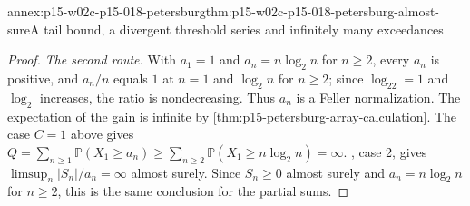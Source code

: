\begin{annexitem}{annex:p15-w02c-p15-018-petersburg}{thm:p15-w02c-p15-018-petersburg-almost-sure}{A tail bound, a divergent threshold series and infinitely many exceedances}
\begin{proof}
\emph{The second route.} With \(a_1=1\) and \(a_n=n\log_2n\) for
\(n\geq2\), every \(a_n\) is positive, and \(a_n/n\) equals \(1\) at
\(n=1\) and \(\log_2n\) for \(n\geq2\); since \(\log_22=1\) and
\(\log_2\) increases, the ratio is nondecreasing. Thus \(a_n\) is a
Feller normalization. The expectation of the gain is infinite by
\cref{thm:p15-petersburg-array-calculation}. The case \(C=1\) above gives
\(Q=\sum_{n\geq1}\mathbb P(X_1\geq a_n)\geq
\sum_{n\geq2}\mathbb P(X_1\geq n\log_2n)=\infty\).
, case 2, gives
\(\limsup_n|S_n|/a_n=\infty\) almost surely. Since \(S_n\geq0\) almost
surely and \(a_n=n\log_2n\) for \(n\geq2\), this is the same
conclusion for the partial sums.
\end{proof}
\end{annexitem}
